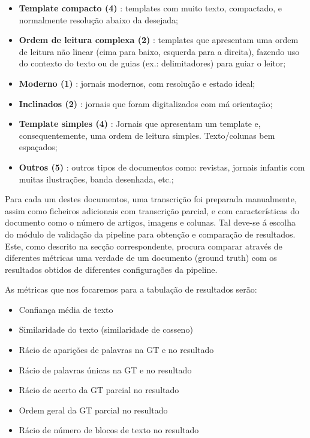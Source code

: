 \begin{itemize}\setlength\itemsep{-0.9em}
	\item \textbf{Template compacto (4)} : templates com muito texto, compactado, e normalmente resolução abaixo da desejada; 
	\item \textbf{Ordem de leitura complexa (2)} : templates que apresentam uma ordem de leitura não linear (cima para baixo, esquerda para a direita), fazendo uso do contexto do texto ou de guias (ex.: delimitadores) para guiar o leitor;
	\item \textbf{Moderno (1)} : jornais modernos, com resolução e estado ideal;
	\item \textbf{Inclinados (2)} : jornais que foram digitalizados com má orientação;
	\item \textbf{Template simples (4)} : Jornais que apresentam um template e, consequentemente, uma ordem de leitura simples. Texto/colunas bem espaçados;
	\item \textbf{Outros (5)} : outros tipos de documentos como: revistas, jornais infantis com muitas ilustrações, banda desenhada, etc.;
\end{itemize}

Para cada um destes documentos, uma transcrição foi preparada manualmente, assim como ficheiros adicionais com transcrição parcial, e com características do documento como o número de artigos, imagens e colunas. 
Tal deve-se á escolha do módulo de validação da pipeline para obtenção e comparação de resultados. Este, como descrito na secção correspondente, procura comparar através de diferentes métricas uma verdade de um documento (ground truth) com os resultados obtidos de diferentes configurações da pipeline.

As métricas que nos focaremos para a tabulação de resultados serão:

\begin{itemize}\setlength\itemsep{-0.9em}
	\item Confiança média de texto
	\item Similaridade do texto (similaridade de cosseno)
	\item Rácio de aparições de palavras na GT e no resultado
	\item Rácio de palavras únicas na GT e no resultado
	\item Rácio de acerto da GT parcial no resultado
	\item Ordem geral da GT parcial no resultado
	\item Rácio de número de blocos de texto no resultado
\end{itemize}



